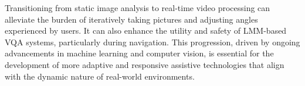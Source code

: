 Transitioning from static image analysis to real-time video processing can alleviate the burden of iteratively taking pictures and adjusting angles experienced by users. It can also enhance the utility and safety of LMM-based VQA systems, particularly during navigation. 
% 
This progression, driven by ongoing advancements in machine learning and computer vision, is essential for the development of more adaptive and responsive assistive technologies that align with the dynamic nature of real-world environments.




% 









